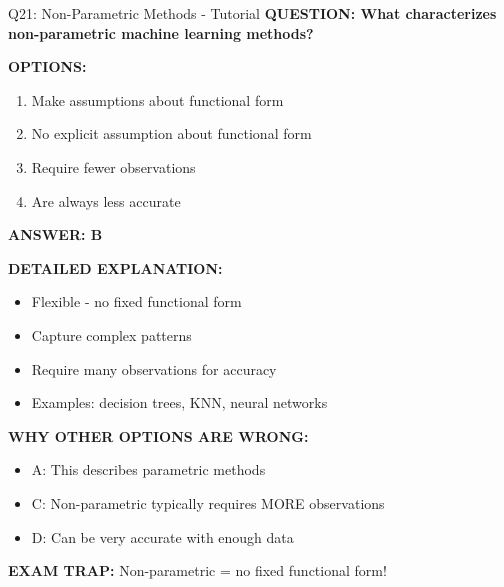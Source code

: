 \documentclass[8pt]{beamer}
\begin{document}
	\begin{frame}{Q21: Non-Parametric Methods - Tutorial}
		\fontsize{6.5}{7.5}\selectfont
		\textbf{QUESTION: What characterizes non-parametric machine learning methods?}
		
		\vspace{0.1cm}
		\textbf{OPTIONS:}
		\begin{enumerate}
			\item Make assumptions about functional form
			\item No explicit assumption about functional form
			\item Require fewer observations
			\item Are always less accurate
		\end{enumerate}
		
		\vspace{0.1cm}
		\textcolor{myblue}{\textbf{ANSWER: B}}
		
		\vspace{0.1cm}
		\textbf{DETAILED EXPLANATION:}
		\begin{itemize}
			\item Flexible - no fixed functional form
			\item Capture complex patterns
			\item Require many observations for accuracy
			\item Examples: decision trees, KNN, neural networks
		\end{itemize}
		
		\vspace{0.1cm}
		\textcolor{myred}{\textbf{WHY OTHER OPTIONS ARE WRONG:}}
		\begin{itemize}
			\item \textcolor{myred}{A:} This describes parametric methods
			\item \textcolor{myred}{C:} Non-parametric typically requires MORE observations
			\item \textcolor{myred}{D:} Can be very accurate with enough data
		\end{itemize}
		
		\textcolor{myred}{\textbf{EXAM TRAP:}} Non-parametric = \textcolor{myblue}{no fixed functional form}!
	\end{frame}
	
\end{document}
